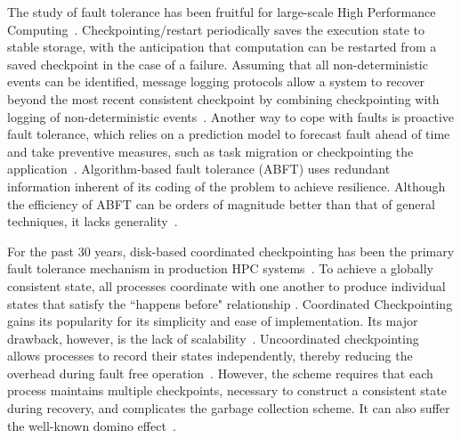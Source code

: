 
The study of fault tolerance has been fruitful for large-scale High Performance Computing~\cite{herault2015fault}. Checkpointing/restart periodically saves the execution state to stable storage, with the anticipation that
computation can be restarted from a saved checkpoint in the case of a failure. 
Assuming that all non-deterministic events can be identified, message logging protocols allow a system to recover beyond the most recent consistent checkpoint by combining checkpointing with logging of non-deterministic events~\cite{Elnozahy:02:Survey}. Another way to cope with faults is proactive fault tolerance, which relies on a prediction model to forecast fault ahead of time and take preventive measures, such as task migration or checkpointing the application~\cite{chakravorty2006proactive,gainaru2012fault}. Algorithm-based fault tolerance (ABFT) uses redundant information inherent of its coding of the problem to achieve resilience. Although the efficiency of ABFT can be orders of magnitude better than that of general techniques, it lacks generality~\cite{herault2015fault}.

For the past 30 years, disk-based coordinated checkpointing has been the primary fault tolerance mechanism in 
production HPC systems~\cite{ferreira_sc_2011}. 
To achieve a globally consistent state, all processes
coordinate with one another to produce individual states that satisfy the ``happens before" relationship \cite{chandy_trans_1972}.
Coordinated Checkpointing gains its popularity for its simplicity and ease of implementation. Its major drawback, however, is the
lack of scalability~\cite{hargrove2006berkeley}.
Uncoordinated checkpointing allows processes to record their states independently, thereby reducing the overhead during fault free operation~\cite{plank_ftc_1999,guermouche_2011_ipdps}. 
However, the scheme requires that
each process maintains multiple checkpoints, necessary to construct a consistent state during recovery, and complicates the garbage collection scheme. It can also suffer the well-known domino effect~\cite{randell_domino_effect}. %


